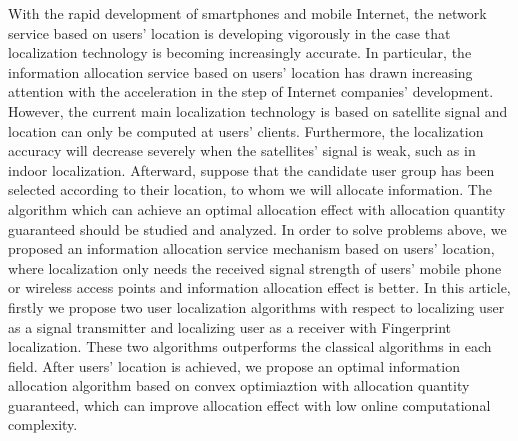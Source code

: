 \begin{eabstract}
   With the rapid development of smartphones and mobile Internet, the network service based on users' location is developing vigorously in the case that localization technology is becoming increasingly accurate. In particular, the information allocation service based on users' location has drawn increasing attention with the acceleration in the step of Internet companies' development. However, the current main localization technology is based on satellite signal and location can only be computed at users' clients. Furthermore, the localization accuracy will decrease severely when the satellites' signal is weak, such as in indoor localization. Afterward, suppose that the candidate user group has been selected according to their location, to whom we will allocate information. The algorithm which can achieve an optimal allocation effect with allocation quantity guaranteed should be studied and analyzed. In order to solve problems above, we proposed an information allocation service mechanism based on users' location, where localization only needs the received signal strength of users' mobile phone or wireless access points and information allocation effect is better. In this article, firstly we propose two user localization algorithms with respect to localizing user as a signal transmitter and localizing user as a receiver with Fingerprint localization. These two algorithms outperforms the classical algorithms in each field. After users' location is achieved, we propose an optimal information allocation algorithm based on convex optimiaztion with allocation quantity guaranteed, which can improve allocation effect with low online computational complexity. 
   

\end{eabstract}
